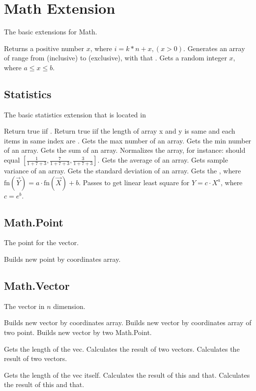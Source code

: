 \section{Math Extension}
The basic extensions for Math.

Returns a positive number $x$, where $i = k * n + x, (x > 0)$.
Generates an array of range from  (inclusive) to  (exclusive), with that .
Gets a random integer $x$, where $ a \leq x \leq b $.
 
\subsection{Statistics}
The basic statistics extension that is located in 

Return true iif .
Return true iif the length of array x and y is same and each items in same index are .
Gets the max number of an array.
Gets the min number of an array.
Gets the sum of an array.
Normalizes the array, for instance:  should equal
$[\frac{1}{1+7+3}, \frac{7}{1+7+3}, \frac{3}{1+7+3}]$.
Gets the average of an array.
Gets sample variance of an array.
Gets the standard deviation of an array.
Gets the \cd{[a, b]}, where $\mathrm{fn}(\vec{Y}) = a \cdot \mathrm{fn}(\vec{X}) + b$. Passes  to get linear least square for $Y = c \cdot X^a$, where $c = e^b$.


\subsection{Math.Point}
The point for the vector.

Builds new point by coordinates array.

\subsection{Math.Vector}
The vector in $n$ dimension.

Builds new vector by coordinates array.
Builds new vector by coordinates array of two point.
Builds new vector by two Math.Point.

Gets the length of the vec.
Calculates the  result of two vectors.
Calculates the  result of two vectors.

Gets the length of the vec itself.
Calculates the  result of this and that.
Calculates the  result of this and that.